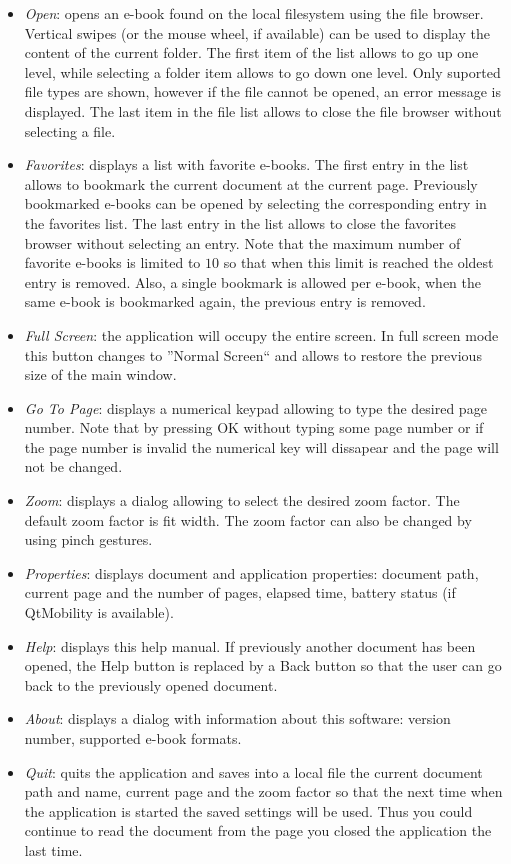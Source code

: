 \documentclass[journal,12pt]{IEEEtran}
\begin{document}
\begin{itemize}
 \item \textit{Open}: opens an e-book found on the local filesystem using the file browser. Vertical swipes (or the mouse wheel, if available) can be used to display the content of the current folder. The first item of the list allows to go up one level, while selecting a folder item allows to go down one level. Only suported file types are shown, however if the file cannot be opened, an error message is displayed. The last item in the file list allows to close the file browser without selecting a file.
 \item \textit{Favorites}: displays a list with favorite e-books. The first entry in the list allows to bookmark the current document at the current page. Previously bookmarked e-books can be opened by selecting the corresponding entry in the favorites list. The last entry in the list allows to close the favorites browser without selecting an entry. Note that the maximum number of favorite e-books is limited to $10$ so that when this limit is reached the oldest entry is removed. Also, a single bookmark is allowed per e-book, when the same   e-book is bookmarked again, the previous entry is removed.
 \item \textit{Full Screen}: the application will occupy the entire screen. In full screen mode this button changes to ''Normal Screen`` and allows to restore the previous size of the main window.
 \item \textit{Go To Page}: displays a numerical keypad allowing to type the desired page number. Note that by pressing OK without typing some page number or if the page number is invalid the numerical key will dissapear and the page will not be changed.
 \item \textit{Zoom}: displays a dialog allowing to select the desired zoom factor. The default zoom factor is fit width. The zoom factor can also be changed by using pinch gestures.
 \item \textit{Properties}: displays document and application properties: document path, current page and the number of pages, elapsed time, battery status (if QtMobility is available).
 \item \textit{Help}: displays this help manual. If previously another document has been opened, the Help button is replaced by a Back button so that the user can go back to the previously opened document.
 \item \textit{About}: displays a dialog with information about this software: version number, supported e-book formats.
 \item \textit{Quit}: quits the application and saves into a local file the current document path and name, current page and the  zoom factor so that the next time when the application is started the saved settings will be used. Thus you could continue to read the document from the page you closed the application the last time.
\end{itemize}
\end{document}

